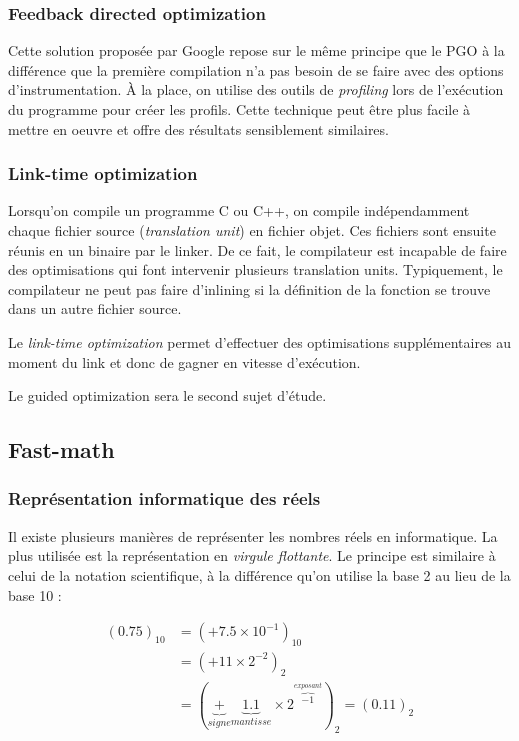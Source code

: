 \documentclass[a4paper,11pt]{report}
\begin{document}
\subsubsection{Feedback directed optimization}
Cette solution proposée par Google \cite{45290} repose sur le même principe que le PGO à la différence que la première compilation n'a pas besoin de se faire avec des options d'instrumentation.
À la place, on utilise des outils de \emph{profiling} lors de l'exécution du programme pour créer les profils.
Cette technique peut être plus facile à mettre en oeuvre et offre des résultats sensiblement similaires.

\subsubsection{Link-time optimization}
Lorsqu'on compile un programme C ou C++, on compile indépendamment chaque fichier source (\emph{translation unit}) en fichier objet.
Ces fichiers sont ensuite réunis en un binaire par le linker.
De ce fait, le compilateur est incapable de faire des optimisations qui font intervenir plusieurs translation units.
Typiquement, le compilateur ne peut pas faire d'inlining si la définition de la fonction se trouve dans un autre fichier source.

Le \emph{link-time optimization} permet d'effectuer des optimisations supplémentaires au moment du link et donc de gagner en vitesse d'exécution.

\bigskip
Le guided optimization sera le second sujet d'étude.

\subsection{Fast-math}

\subsubsection{Représentation informatique des réels}
Il existe plusieurs manières de représenter les nombres réels en informatique.
La plus utilisée est la représentation en \emph{virgule flottante}.
Le principe est similaire à celui de la notation scientifique, à la différence qu'on utilise la base 2 au lieu de la base 10 :

\begin{displaymath}
    \begin{split}
        (0.75)_{10} & = (+ 7.5 \times 10^{-1})_{10} \\
        & = (+11 \times 2^{-2})_{2} \\
        & = (\underbrace{+}_{signe} \underbrace{1.1}_{mantisse} \times 2^{\overbrace{-1}^{exposant}})_{2} = (0.11)_{2}
    \end{split}
\end{displaymath}
\end{document}
